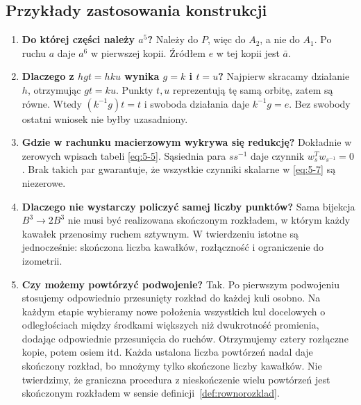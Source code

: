 \subsection{Przykłady zastosowania konstrukcji}
\begin{enumerate}
\item \textbf{Do której części należy $a^5$?} Należy do $P$, więc do $A_2$, a nie do $A_1$. Po ruchu $a$ daje $a^6$ w pierwszej kopii. Źródłem $e$ w tej kopii jest $\bar a$.
\item \textbf{Dlaczego z $hgt=hku$ wynika $g=k$ i $t=u$?} Najpierw skracamy działanie $h$, otrzymując $gt=ku$. Punkty $t,u$ reprezentują tę samą orbitę, zatem są równe. Wtedy $(k^{-1}g)t=t$ i swoboda działania daje $k^{-1}g=e$. Bez swobody ostatni wniosek nie byłby uzasadniony.
\item \textbf{Gdzie w rachunku macierzowym wykrywa się redukcję?} Dokładnie w zerowych wpisach tabeli \eqref{eq:5-5}. Sąsiednia para $ss^{-1}$ daje czynnik $w_s^Tw_{s^{-1}}=0$. Brak takich par gwarantuje, że wszystkie czynniki skalarne w \eqref{eq:5-7} są niezerowe.
\item \textbf{Dlaczego nie wystarczy policzyć samej liczby punktów?} Sama bijekcja $B^3\to2B^3$ nie musi być realizowana skończonym rozkładem, w którym każdy kawałek przenosimy ruchem sztywnym. W twierdzeniu istotne są jednocześnie: skończona liczba kawałków, rozłączność i ograniczenie do izometrii.
\item \textbf{Czy możemy powtórzyć podwojenie?} Tak. Po pierwszym podwojeniu stosujemy odpowiednio przesunięty rozkład do każdej kuli osobno. Na każdym etapie wybieramy nowe położenia wszystkich kul docelowych o odległościach między środkami większych niż dwukrotność promienia, dodając odpowiednie przesunięcia do ruchów. Otrzymujemy cztery rozłączne kopie, potem osiem itd. Każda ustalona liczba powtórzeń nadal daje skończony rozkład, bo mnożymy tylko skończone liczby kawałków. Nie twierdzimy, że graniczna procedura z nieskończenie wielu powtórzeń jest skończonym rozkładem w sensie definicji~\ref{def:rownorozklad}.
\end{enumerate}

